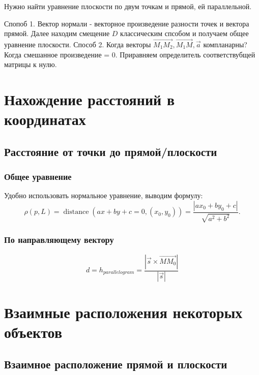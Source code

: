 \documentclass[12pt, a4paper]{article}
\begin{document}
    \begin{example}
        Нужно найти уравнение плоскости по двум точкам и прямой, ей параллельной.

        Спопоб 1. Вектор нормали - векторное произведение разности точек и вектора прямой. Далее находим смещение $D$ классическим спсобом и получаем общее уравнение плоскости.
        Способ 2. Когда векторы $\vec{M_1M_2}, \vec{M_1M}, \vec{a}$ компланарны? Когда смешанное произведение = 0. Приравняем определитель соответствубщей матрицы к нулю.
    \end{example}

    \section{Нахождение расстояний в координатах}

    \subsection{Расстояние от точки до прямой/плоскости}

    
    \subsubsection{Общее уравнение}

    Удобно использовать нормальное уравнение, выводим формулу:
    \begin{equation}
        {\displaystyle \rho(p, L) = \operatorname {distance} (ax+by+c=0,(x_{0},y_{0}))={\frac {|ax_{0}+by_{0}+c|}{\sqrt {a^{2}+b^{2}}}}.}
    \end{equation}


    \subsubsection{По направляющему вектору}

    \begin{equation}
        d = h_{parallelogram} = \frac{|\vec{s} \times\overrightarrow{MM_0}|}{|\vec{s}|}
    \end{equation}


    \section{Взаимные расположения некоторых объектов}

    \subsection{Взаимное расположение прямой и плоскости}
\end{document}
